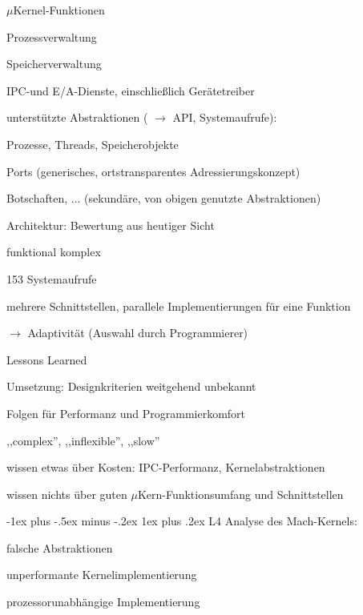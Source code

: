 \documentclass[a4paper]{article}
\makeatletter
\newcommand{\xmark}{\ding{55}}
\renewcommand{\subsubsection}{\@startsection{subsubsection}{3}{0mm}%
 {-1ex plus -.5ex minus -.2ex}%
 {1ex plus .2ex}%
 {\normalfont\small\bfseries}}
\makeatother
\begin{document}
\begin{multicols}{3}
    $\mu$Kernel-Funktionen
    \begin{enumerate*}
        \item Prozessverwaltung
        \item Speicherverwaltung
        \item IPC-und E/A-Dienste, einschließlich Gerätetreiber
    \end{enumerate*}

    unterstützte Abstraktionen ( $\rightarrow$ API, Systemaufrufe):
    \begin{enumerate*}
        \item Prozesse, Threads, Speicherobjekte
        \item Ports (generisches, ortstransparentes Adressierungskonzept)
        \item Botschaften, ... (sekundäre, von obigen genutzte Abstraktionen)
    \end{enumerate*}

    Architektur: Bewertung aus heutiger Sicht
        \begin{itemize*}
            \item funktional komplex
            \item 153 Systemaufrufe
            \item mehrere Schnittstellen, parallele Implementierungen für eine Funktion
            \item[$\rightarrow$] Adaptivität (Auswahl durch Programmierer)
        \end{itemize*}

    Lessons Learned
    \begin{itemize*}
        \item Umsetzung: Designkriterien weitgehend unbekannt
        \item Folgen für Performanz und Programmierkomfort
        \item[\xmark] ,,complex'', ,,inflexible'', ,,slow''
        \item wissen etwas über Kosten: IPC-Performanz, Kernelabstraktionen
        \item wissen nichts über guten $\mu$Kern-Funktionsumfang und Schnittstellen
    \end{itemize*}

    \subsubsection{L4}
    Analyse des Mach-Kernels:
    \begin{enumerate*}
        \item falsche Abstraktionen
        \item unperformante Kernelimplementierung
        \item prozessorunabhängige Implementierung
    \end{enumerate*}


\end{multicols}
\end{document}
